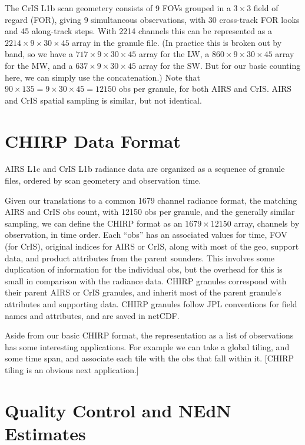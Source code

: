 \documentclass[12pt]{article}
\begin{document}
The CrIS L1b scan geometery consists of 9 FOVs grouped in a $3
\times 3$ field of regard (FOR), giving 9 simultaneous observations,
with 30 cross-track FOR looks and 45 along-track steps.  With 2214
channels this can be represented as a $2214 \times 9 \times 30
\times 45$ array in the granule file.  (In practice this is broken
out by band, so we have a $717 \times 9 \times 30 \times 45$ array
for the LW, a $860 \times 9 \times 30 \times 45$ array for the MW,
and a $637 \times 9 \times 30 \times 45$ array for the SW.  But for
our basic counting here, we can simply use the concatenation.)
Note that $90 \times 135 = 9 \times 30 \times 45 = 12150$ obs per
granule, for both AIRS and CrIS.  AIRS and CrIS spatial sampling is
similar, but not identical.

\section{CHIRP Data Format}
\label{format}

AIRS L1c and CrIS L1b radiance data are organized as a sequence of
granule files, ordered by scan geometery and observation time.

Given our translations to a common 1679 channel radiance format,
the matching AIRS and CrIS obs count, with 12150 obs per granule,
and the generally similar sampling, we can define the CHIRP format
as an $1679 \times 12150$ array, channels by observation, in time
order.  Each ``obs'' has an associated values for time, FOV (for
CrIS), original indices for AIRS or CrIS, along with most of the
geo, support data, and product attributes from the parent sounders.
This involves some duplication of information for the individual
obs, but the overhead for this is small in comparison with the
radiance data.  CHIRP granules correspond with their parent AIRS or
CrIS granules, and inherit most of the parent granule's attributes
and supporting data.  CHIRP granules follow JPL conventions for
field names and attributes, and are saved in netCDF.

Aside from our basic CHIRP format, the representation as a list of
observations has some interesting applications.  For example we can
take a global tiling, and some time span, and associate each tile
with the obs that fall within it.  [CHIRP tiling is an obvious next
application.]

\section{Quality Control and NEdN Estimates}
\label{qcnedn}
\end{document}
